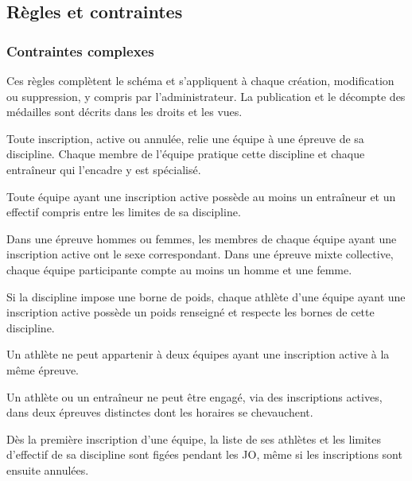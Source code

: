 \subsection{Règles et contraintes}

\subsubsection{Contraintes complexes}

Ces règles complètent le schéma et s'appliquent à chaque création, modification ou suppression, y compris par l'administrateur. La publication et le décompte des médailles sont décrits dans les droits et les vues.

\begin{contraintes}[itemsep=0.5\baselineskip]

  \item \label{ctr:discipline}  Toute inscription, active ou annulée, relie une équipe à une épreuve de sa discipline. Chaque membre de l'équipe pratique cette discipline et chaque entraîneur qui l'encadre y est spécialisé.

  \item \label{ctr:effectif-equipe}  Toute équipe ayant une inscription active possède au moins un entraîneur et un effectif compris entre les limites de sa discipline.

  \item \label{ctr:sexe-participants}  Dans une épreuve hommes ou femmes, les membres de chaque équipe ayant une inscription active ont le sexe correspondant. Dans une épreuve mixte collective, chaque équipe participante compte au moins un homme et une femme.

  \item \label{ctr:poids-participants}  Si la discipline impose une borne de poids, chaque athlète d'une équipe ayant une inscription active possède un poids renseigné et respecte les bornes de cette discipline.

  \item \label{ctr:personnes}  Un athlète ne peut appartenir à deux équipes ayant une inscription active à la même épreuve. 
  
  \item \label{ctr:uniq-participants} Un athlète ou un entraîneur ne peut être engagé, via des inscriptions actives, dans deux épreuves distinctes dont les horaires se chevauchent.

  \item \label{ctr:composition} Dès la première inscription d'une équipe, la liste de ses athlètes et les limites d'effectif de sa discipline sont figées pendant les JO, même si les inscriptions sont ensuite annulées.


\end{contraintes}
